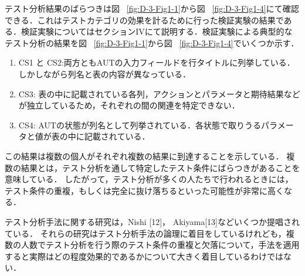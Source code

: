 \documentclass[a4paper,11pt]{jreport}
\begin{document}
テスト分析結果のばらつきは図 ~\ref{fig:D-3-Fig1-1}から図 ~\ref{fig:D-3-Fig1-4}にて確認できる．これはテストカテゴリの効果を計るために行った検証実験の結果である．検証実験についてはセクションIVにて説明する．検証実験による典型的なテスト分析の結果を図 ~\ref{fig:D-3-Fig1-1}から図 ~\ref{fig:D-3-Fig1-4}でいくつか示す．
\begin{enumerate}
\item CS1 と CS2:両方ともAUTの入力フィールドを行タイトルに列挙している．しかしながら列名と表の内容が異なっている．
\item CS3: 表の中に記載されている各列，アクションとパラメータと期待結果などが独立しているため，それぞれの間の関連を特定できない．
\item CS4: AUTの状態が列名として列挙されている．各状態で取りうるパラメータと値が表の中に記載されている．
\end{enumerate}

この結果は複数の個人がそれぞれ複数の結果に到達することを示している．
複数の結果とは，テスト分析を通して特定したテスト条件にばらつきがあることを意味している．
したがって，テスト分析が多くの人たちで行われるときには，テスト条件の重複，もしくは完全に抜け落ちるといった可能性が非常に高くなる．



テスト分析手法に関する研究は，Nishi [12]， Akiyama[13]などいくつか提唱されている．
それらの研究はテスト分析手法の論理に着目をしているけれども，複数の人数でテスト分析を行う際のテスト条件の重複と欠落について，手法を適用すると実際はどの程度効果的であるかについて大きく着目しているわけではない．
\end{document}
